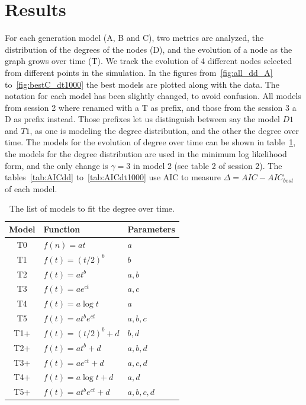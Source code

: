 \documentclass[a4paper]{article}
\begin{document}
\section{Results}
%
For each generation model (A, B and C), two metrics are analyzed, the
distribution of the degrees of the nodes (D), and the evolution of a node as the
graph grows over time (T).  We track the evolution of 4 different nodes selected
from different points in the simulation. In the figures from~\ref{fig:all_dd_A}
to~\ref{fig:bestC_dt1000} the best models are plotted along with the data. The
notation for each model has been slightly changed, to avoid confusion. All
models from session 2 where renamed with a T as prefix, and those from the
session 3 a D as prefix instead. Those prefixes let us distinguish between say
the model $D1$ and $T1$, as one is modeling the degree distribution, and the
other the degree over time. The models for the evolution of degree over time can
be shown in table~\ref{tab:Tmodels}, the models for the degree distribution are
used in the minimum log likelihood form, and the only change is $\gamma = 3 $ in
model 2 (see table 2 of session 2).
%
The tables~\ref{tab:AICdd} to~\ref{tab:AICdt1000} use AIC to
measure $\Delta = AIC - AIC_{best}$ of each model.
%
\begin{table}[H]
	\centering
	\begin{tabular}{cll}
		\toprule
		Model & Function & Parameters\\
		\midrule
		T0  & $f(n) = at$								& $a$ \\
		T1  & $f(t) = (t/2)^b$					& $b$ \\
		T2  & $f(t) = at^b$ 						& $a,b$\\
		T3  & $f(t) = ae^{ct}$					& $a,c$\\
		T4  & $f(t) = a\log t$					& $a$\\
		T5  & $f(t) = at^be^{ct}$				& $a,b,c$\\
		T1+ & $f(t) = (t/2)^b + d$			& $b,d$\\
		T2+ & $f(t) = at^b + d$					& $a,b,d$\\
		T3+ & $f(t) = ae^{ct} + d$			& $a,c,d$\\
		T4+ & $f(t) = a\log t + d$			& $a,d$\\
		T5+ & $f(t) = at^be^{ct} + d$	& $a,b,c,d$\\
		\bottomrule
	\end{tabular}
	\caption{The list of models to fit the degree over time.}
	\label{tab:Tmodels}
\end{table}
\end{document}
